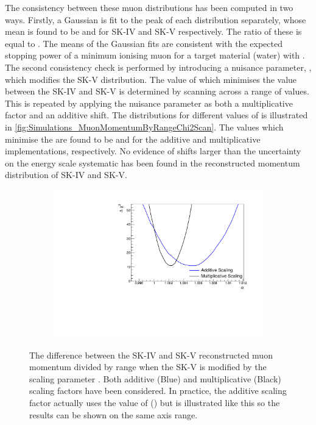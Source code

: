 The consistency between these muon distributions has been computed in two ways. Firstly, a Gaussian is fit to the peak of each distribution separately, whose mean is found to be  and  for SK-IV and SK-V respectively. The ratio of these is equal to . The means of the Gaussian fits are consistent with the expected stopping power of a minimum ionising muon for a target material (water) with  \cite{PhysRevD.86.010001}. The second consistency check is performed by introducing a nuisance parameter, \quickmath{\alpha}, which modifies the SK-V distribution. The value of \quickmath{\alpha} which minimises the  value between the SK-IV and SK-V is determined by scanning across a range of values. This is repeated by applying the nuisance parameter as both a multiplicative factor and an additive shift. The  distributions for different values of \quickmath{\alpha} is illustrated in \autoref{fig:Simulations_MuonMomentumByRangeChi2Scan}. The values which minimise the  are found to be  and  for the additive and multiplicative implementations, respectively. No evidence of shifts larger than the  uncertainty on the energy scale systematic has been found in the reconstructed momentum distribution of SK-IV and SK-V.

\begin{figure}[h]
  \begin{subfigure}[t]{\textwidth}
    \includegraphics[width=\textwidth, trim={0mm 0mm 0mm 0mm}, clip, page=1]{Figures/Simulations/MuonRange_Chi2Scan.pdf}
  \end{subfigure}
  \caption{The  difference between the SK-IV and SK-V reconstructed muon momentum divided by range when the SK-V is modified by the scaling parameter \quickmath{\alpha}. Both additive (Blue) and multiplicative (Black) scaling factors have been considered. In practice, the additive scaling factor actually uses the value of () but is illustrated like this so the results can be shown on the same axis range.}
  \label{fig:Simulations_MuonMomentumByRangeChi2Scan}
\end{figure}

